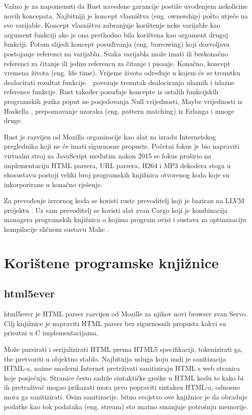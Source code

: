 \documentclass[times, utf8, zavrsni]{fer}
\begin{document}
Važno je za napomenuti da Rust navedene garancije postiže uvođenjem nekolicine
novih koncepata. Najbitniji je koncept vlasništva (eng. ownership) pošto utječe
na sve varijable. Koncept vlasništva zabranjuje korištenje neke varijable kao
argument funkciji ako je ona prethodno bila korištena kao argument drugoj
funkciji. Potom slijedi koncept posuđivanja (eng. borrowing) koji dozvoljava
postojanje referenci na varijablu. Svaka varijabla može imati ili beskonačno
referenci za čitanje ili jednu referencu za čitanje i pisanje. Konačno, koncept
vremena života (eng. life time). Vrijeme života određuje u kojem će se trenutku
dealocirati rezultat funkcije. \ povezuje trenutak dealociranja ulaznih i
izlazne reference funkcije. Rust također posuđuje koncepte iz ostalih
funkcijskih programskih jezika poput ne posjedovanja Null vrijednosti, Maybe
vrijednosti iz Haskella \cite{haskell_lang_page}, prepoznavanje uzoraka
(eng. pattern matching) iz Erlanga \cite{erlang_lang_page} i mnoge druge.

Rust je razvijen od Mozilla organizacije kao alat za izradu Internetskog
preglednika koji ne će imati sigurnosne propuste. Početni fokus je bio
napraviti virtualni stroj za JavaScript međutim nakon 2015 se fokus proširio na
implementaciju HTML parsera, URL parsera, H264 i MP3 dekodera stoga u ekosustavu
postoji veliki broj programskih knjižnica otvorenog koda koje su inkorporirane
u konačno rješenje.

Za prevođenje izvornog koda se koristi rustc prevoditelj koji je baziran na
LLVM projektu \cite{llvm_page}. Uz sam prevoditelj se koristi alat zvan
Cargo \cite{cargo_documentation}
koji je kombinacija managera programskih knjižnica o kojima program ovisi i
sustava za optimizaciju kompilacije sličnom sustavu
Make \cite{make_documentation}.

\section{Korištene programske knjižnice}

\subsection{html5ever}

html5ever \cite{html5ever_repository} je HTML parser razvijen od Mozille za
njihov novi browser zvan Servo.
Cilj knjižnice je napraviti HTML parser bez sigurnosnih propusta kakvi su
prisutni u C implementacijama.

Može parsirati i serijalizirati HTML prema HTML5 specifikaciji, tokenizirati ga,
the pretvoriti u objektno stablo. Najbitnija usluga koju nudi je sanitizacija
HTML-a, naime moderni Internet pretrživati sanitiziraju HTML s web stranica
koje posjećuju. Stranice često sadrže sintaktičke greške u HTML kodu te kako
bi ih pretraživač mogao prikazati mora prvo popraviti sintaksu HTML-a,
odnosno mora ga sanitizirati. Osim sanitizacije, bitno svojstvo ove
knjižnice je da obraduje podatke kao tok podataka (eng. stream) sto znatno
smanjuje potrošnju memorije.
\end{document}
